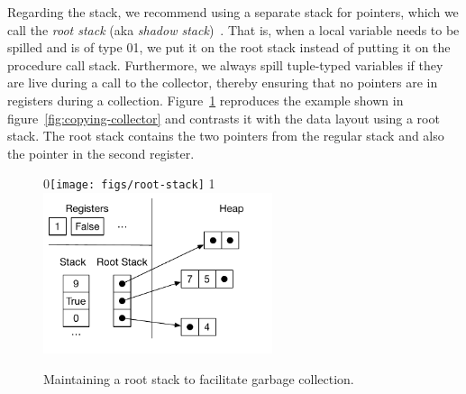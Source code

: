 \documentclass[7x10]{TimesAPriori_MIT}%
\def\racketEd{0}
\def\pythonEd{1}
\def\edition{1}
\newcommand{\racket}[1]{{\if\edition\racketEd{#1}\fi}}
\newcommand{\pythonColor}[0]{}
\newcommand{\python}[1]{{\if\edition\pythonEd\pythonColor #1\fi}}
\numberwithin{theorem}{chapter}
\numberwithin{definition}{chapter}
\numberwithin{equation}{chapter}
\begin{document}
Regarding the stack, we recommend using a separate stack for pointers,
which we call the \emph{root stack}
(aka \emph{shadow stack})~\citep{Siebert:2001aa,Henderson:2002aa,Baker:2009aa}.
That is, when a local variable needs to be spilled and is of type
\racket{}\python{}, we put it on the
root stack instead of putting it on the procedure call
stack. Furthermore, we always spill tuple-typed variables if they are
live during a call to the collector, thereby ensuring that no pointers
are in registers during a collection. Figure~\ref{fig:shadow-stack}
reproduces the example shown in figure~\ref{fig:copying-collector} and
contrasts it with the data layout using a root stack. The root stack
contains the two pointers from the regular stack and also the pointer
in the second register.

\begin{figure}[tbp]
  \centering
  \begin{tcolorbox}[colback=white]
    \racket{\texttt{[image: figs/root-stack]}}
  \python{\includegraphics[width=0.60\textwidth]{figs/root-stack-python}}
  \end{tcolorbox}

  \caption{Maintaining a root stack to facilitate garbage collection.}
\label{fig:shadow-stack}
\end{figure}
\end{document}
